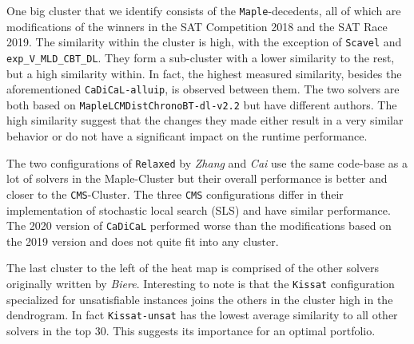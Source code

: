 \documentclass{elsarticle}
\newcommand{\solver}[1]{\texttt{#1}}
\begin{document}
One big cluster that we identify consists of the \solver{Maple}-decedents,
all of which are modifications of the winners in the SAT Competition 2018 and
the SAT Race 2019.
The similarity within the cluster is high, with the exception of
\solver{Scavel} and \solver{exp\_V\_MLD\_CBT\_DL}.
They form a sub-cluster
with a lower similarity to the rest, but a high similarity within. In fact, the highest measured similarity,
besides the aforementioned \solver{CaDiCaL-alluip}, is observed between them.
The two solvers are both based on
\solver{MapleLCMDistChronoBT-dl-v2.2} but have different authors.
The high similarity suggest that the
changes they made either result in a very similar behavior or do not have a
significant impact on the runtime performance.

The two configurations of \solver{Relaxed} by \emph{Zhang} and \emph{Cai}
use the same code-base as a lot of solvers in the Maple-Cluster but their
overall performance is better and closer to the \solver{CMS}-Cluster.
The three \solver{CMS} configurations
differ in their implementation of stochastic local search
(SLS) and have similar performance.
The 2020 version of \solver{CaDiCaL}
performed worse than the modifications based on the 2019 version and
does not quite fit into any cluster.

The last cluster to the left of the heat map is comprised of the other solvers
originally written by \emph{Biere}. Interesting to note is that the
\solver{Kissat} configuration specialized for unsatisfiable instances joins the
others in the cluster high in the dendrogram. In fact \solver{Kissat-unsat} has
the lowest average similarity to all other solvers in the top 30.
This suggests its importance for an optimal
portfolio.

\end{document}
